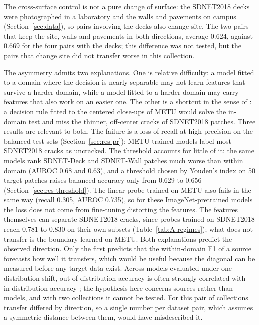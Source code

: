 \documentclass[pdflatex,sn-apa]{sn-jnl}
\begin{document}
The cross-surface control is not a pure change of surface: the SDNET2018 decks were photographed in a laboratory and the walls and pavements on campus (Section~\ref{sec:data}), so pairs involving the decks also change site. The two pairs that keep the site, walls and pavements in both directions, average 0.624, against 0.669 for the four pairs with the decks; this difference was not tested, but the pairs that change site did not transfer worse in this collection.

The asymmetry admits two explanations. One is relative difficulty: a model fitted to a domain where the decision is nearly separable may not learn features that survive a harder domain, while a model fitted to a harder domain may carry features that also work on an easier one. The other is a shortcut in the sense of \citet{geirhos2020}: a decision rule fitted to the centered close-ups of METU would solve the in-domain test and miss the thinner, off-center cracks of SDNET2018 patches. Three results are relevant to both. The failure is a loss of recall at high precision on the balanced test sets (Section~\ref{sec:res-pr}): METU-trained models label most SDNET2018 cracks as uncracked. The threshold accounts for little of it: the same models rank SDNET-Deck and SDNET-Wall patches much worse than within domain (AUROC 0.68 and 0.63), and a threshold chosen by Youden's index on 50 target patches raises balanced accuracy only from 0.629 to 0.656 (Section~\ref{sec:res-threshold}). The linear probe trained on METU also fails in the same way (recall 0.305, AUROC 0.735), so for these ImageNet-pretrained models the loss does not come from fine-tuning distorting the features. The features themselves can separate SDNET2018 cracks, since probes trained on SDNET2018 reach 0.781 to 0.830 on their own subsets (Table~\ref{tab:A-regimes}); what does not transfer is the boundary learned on METU. Both explanations predict the observed direction. Only the first predicts that the within-domain F1 of a source forecasts how well it transfers, which would be useful because the diagonal can be measured before any target data exist. Across models evaluated under one distribution shift, out-of-distribution accuracy is often strongly correlated with in-distribution accuracy \citep{miller2021}; the hypothesis here concerns sources rather than models, and with two collections it cannot be tested. For this pair of collections transfer differed by direction, so a single number per dataset pair, which assumes a symmetric distance between them, would have misdescribed it.
\end{document}
